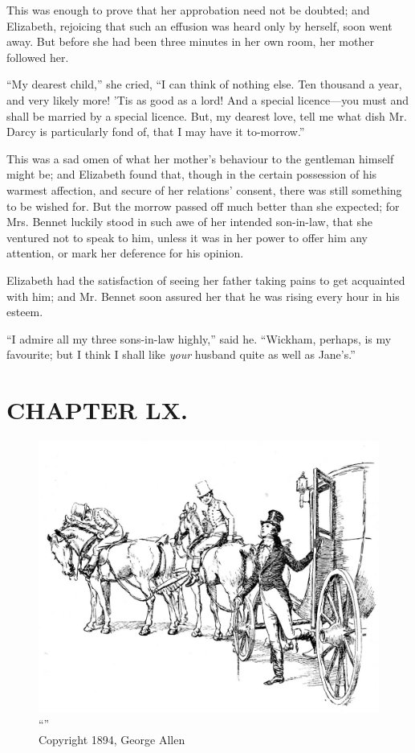 This was enough to prove that her approbation need not be doubted; and Elizabeth, rejoicing that such an effusion was heard only by herself, soon went away. But before she had been three minutes in her own room, her mother followed her.

``My dearest child,'' she cried, ``I can think of nothing else. Ten thousand a year, and very likely more! 'Tis as good as a lord! And a special licence---you must and shall be married by a special licence. But, my dearest love, tell me what dish Mr. Darcy is particularly fond of, that I may have it to-morrow.''

This was a sad omen of what her mother's behaviour to the gentleman himself might be; and Elizabeth found that, though in the certain possession of his warmest affection, and secure of her relations' consent, there was still something to be wished for. But the morrow passed off much better than she expected; for Mrs. Bennet luckily stood in such awe of her intended son-in-law, that she ventured not to speak to him, unless it was in her power to offer him any attention, or mark her deference for his opinion.

Elizabeth had the satisfaction of seeing her father taking pains to get acquainted with him; and Mr. Bennet soon assured her that he was rising every hour in his esteem.

``I admire all my three sons-in-law highly,'' said he. ``Wickham, perhaps, is my favourite; but I think I shall like \textit{your} husband quite as well as Jane's.''



\chapter{CHAPTER LX.}

\begin{figure}[htbp]
    \centering
    \includegraphics[width=\textwidth]{illustrations/i_031.jpg}
    \caption{“”\\ Copyright 1894, George Allen}
    \label{fig:image}
\end{figure}


